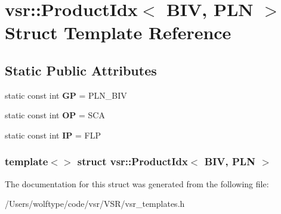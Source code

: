 \hypertarget{structvsr_1_1_product_idx_3_01_b_i_v_00_01_p_l_n_01_4}{\section{vsr\-:\-:Product\-Idx$<$ B\-I\-V, P\-L\-N $>$ Struct Template Reference}
\label{structvsr_1_1_product_idx_3_01_b_i_v_00_01_p_l_n_01_4}
}
\subsection*{Static Public Attributes}
\begin{DoxyCompactItemize}
\item 
\hypertarget{structvsr_1_1_product_idx_3_01_b_i_v_00_01_p_l_n_01_4_a38d18bdfcc3c2e63b481abeea767061e}{static const int {\bfseries G\-P} = P\-L\-N\-\_\-\-B\-I\-V}\label{structvsr_1_1_product_idx_3_01_b_i_v_00_01_p_l_n_01_4_a38d18bdfcc3c2e63b481abeea767061e}

\item 
\hypertarget{structvsr_1_1_product_idx_3_01_b_i_v_00_01_p_l_n_01_4_acf11705af05ffaed85fea66f604533f0}{static const int {\bfseries O\-P} = S\-C\-A}\label{structvsr_1_1_product_idx_3_01_b_i_v_00_01_p_l_n_01_4_acf11705af05ffaed85fea66f604533f0}

\item 
\hypertarget{structvsr_1_1_product_idx_3_01_b_i_v_00_01_p_l_n_01_4_a2f7c85e3d25a252d467bff8e0bf45910}{static const int {\bfseries I\-P} = F\-L\-P}\label{structvsr_1_1_product_idx_3_01_b_i_v_00_01_p_l_n_01_4_a2f7c85e3d25a252d467bff8e0bf45910}

\end{DoxyCompactItemize}
\subsubsection*{template$<$$>$ struct vsr\-::\-Product\-Idx$<$ B\-I\-V, P\-L\-N $>$}



The documentation for this struct was generated from the following file\-:\begin{DoxyCompactItemize}
\item 
/\-Users/wolftype/code/vsr/\-V\-S\-R/vsr\-\_\-templates.\-h\end{DoxyCompactItemize}
